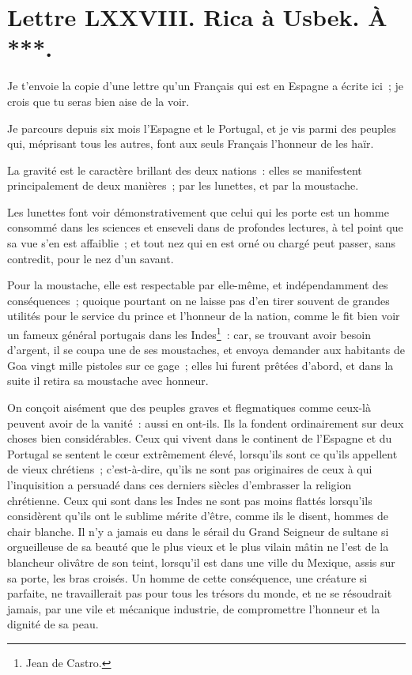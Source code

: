 \documentclass[french,twoside]{book} %
\begin{document}
\section[{Lettre LXXVIII. Rica à Usbek. À ***.}]{Lettre LXXVIII. Rica à Usbek. À ***.}\renewcommand{\leftmark}{Lettre LXXVIII. Rica à Usbek. À ***.}

\noindent Je t’envoie la copie d’une lettre qu’un Français qui est en Espagne a écrite ici ; je crois que tu seras bien aise de la voir.\par
Je parcours depuis six mois l’Espagne et le Portugal, et je vis parmi des peuples qui, méprisant tous les autres, font aux seuls Français l’honneur de les haïr.\par
La gravité est le caractère brillant des deux nations : elles se manifestent principalement de deux manières ; par les lunettes, et par la moustache.\par
Les lunettes font voir démonstrativement que celui qui les porte est un homme consommé dans les sciences et enseveli dans de profondes lectures, à tel point que sa vue s’en est affaiblie ; et tout nez qui en est orné ou chargé peut passer, sans contredit, pour le nez d’un savant.\par
Pour la moustache, elle est respectable par elle-même, et indépendamment des conséquences ; quoique pourtant on ne laisse pas d’en tirer souvent de grandes utilités pour le service du prince et l’honneur de la nation, comme le fit bien voir un fameux général portugais dans les Indes\footnote{Jean de Castro.} : car, se trouvant avoir besoin d’argent, il se coupa une de ses moustaches, et envoya demander aux habitants de Goa vingt mille pistoles sur ce gage ; elles lui furent prêtées d’abord, et dans la suite il retira sa moustache avec honneur.\par
On conçoit aisément que des peuples graves et flegmatiques comme ceux-là peuvent avoir de la vanité : aussi en ont-ils. Ils la fondent ordinairement sur deux choses bien considérables. Ceux qui vivent dans le continent de l’Espagne et du Portugal se sentent le cœur extrêmement élevé, lorsqu’ils sont ce qu’ils appellent de vieux chrétiens ; c’est-à-dire, qu’ils ne sont pas originaires de ceux à qui l’inquisition a persuadé dans ces derniers siècles d’embrasser la religion chrétienne. Ceux qui sont dans les Indes ne sont pas moins flattés lorsqu’ils considèrent qu’ils ont le sublime mérite d’être, comme ils le disent, hommes de chair blanche. Il n’y a jamais eu dans le sérail du Grand Seigneur de sultane si orgueilleuse de sa beauté que le plus vieux et le plus vilain mâtin ne l’est de la blancheur olivâtre de son teint, lorsqu’il est dans une ville du Mexique, assis sur sa porte, les bras croisés. Un homme de cette conséquence, une créature si parfaite, ne travaillerait pas pour tous les trésors du monde, et ne se résoudrait jamais, par une vile et mécanique industrie, de compromettre l’honneur et la dignité de sa peau.\par
\end{document}
